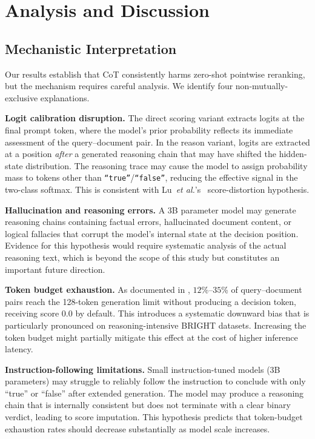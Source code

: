 \documentclass[12pt]{article}
\newcommand{\CoT}{CoT}
\newcommand{\etal}{\textit{et al.}}
\begin{document}
\section{Analysis and Discussion}
\label{sec:analysis}

\subsection{Mechanistic Interpretation}
\label{sec:mechanism}

Our results establish that \CoT{} consistently harms zero-shot pointwise
reranking, but the mechanism requires careful analysis.  We identify four
non-mutually-exclusive explanations.

\textbf{Logit calibration disruption.}  The direct scoring variant extracts
logits at the final prompt token, where the model's prior probability reflects
its immediate assessment of the query--document pair.  In the reason variant,
logits are extracted at a position \emph{after} a generated reasoning chain that
may have shifted the hidden-state distribution.  The reasoning trace may cause
the model to assign probability mass to tokens other than \texttt{``true''}/\texttt{``false''},
reducing the effective signal in the two-class softmax.  This is consistent with
Lu~\etal's~\citep{lu2025rethinking} score-distortion hypothesis.

\textbf{Hallucination and reasoning errors.}  A 3B parameter model may generate
reasoning chains containing factual errors, hallucinated document content, or
logical fallacies that corrupt the model's internal state at the decision
position.  Evidence for this hypothesis would require systematic analysis of the
actual reasoning text, which is beyond the scope of this study but constitutes
an important future direction.

\textbf{Token budget exhaustion.}  As documented in ,
$12$\%--$35$\% of query--document pairs reach the 128-token generation limit
without producing a decision token, receiving score $0.0$ by default.  This
introduces a systematic downward bias that is particularly pronounced on
reasoning-intensive BRIGHT datasets.  Increasing the token budget might
partially mitigate this effect at the cost of higher inference latency.

\textbf{Instruction-following limitations.}  Small instruction-tuned models
(3B parameters) may struggle to reliably follow the instruction to conclude
with only ``true'' or ``false'' after extended generation.  The model may produce
a reasoning chain that is internally consistent but does not terminate with a
clear binary verdict, leading to score imputation.  This hypothesis predicts
that token-budget exhaustion rates should decrease substantially as model scale
increases.
\end{document}

